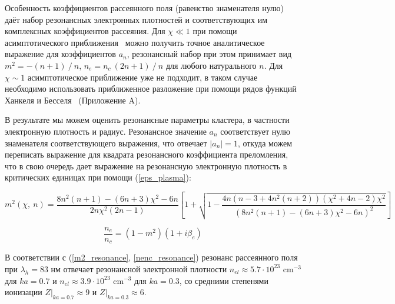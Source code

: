 
Особенность коэффициентов рассеянного поля (равенство знаменателя нулю) даёт набор резонансных электронных плотностей и соответствующих им комплексных коэффициентов рассеяния. Для $\chi \ll 1$ при помощи асимптотического приближения~\cite{andreev_lecz} можно получить точное аналитическое выражение для коэффициентов $a_n$, резонансный набор при этом принимает вид $m^2 = - (n + 1)\:/\:n$, $n_e = n_c\:(2n + 1)\:/\:n$ для любого натурального $n$. Для $\chi \sim 1$ асимптотическое приближение уже не подходит, в таком случае необходимо использовать приближенное разложение при помощи рядов функций Ханкеля и Бесселя~\cite{boren_huffman} (Приложение A).

В результате мы можем оценить резонансные параметры кластера, в частности электронную плотность и радиус. Резонансное значение $a_n$ соответствует нулю знаменателя соответствующего выражения, что отвечает $|a_n| = 1$, откуда можем переписать выражение для квадрата резонансного коэффициента преломления, что в свою очередь дает выражение на резонансную электронную плотность в критических единицах при помощи (\ref{eps_plasma}):

    \begin{equation}
        m^2 \left(\chi,\:n \right) = \frac{8n^2 (n + 1) - (6n + 3)\chi^2 - 6n}{2n \chi^2 (2n-1)} \left[ 1 + \sqrt{ 1 - \frac{4n (n-3 + 4n^2 (n + 2)) (\chi^2 + 4n-2) \chi^2}{{\left(8n^2 (n + 1) - (6n + 3)\chi^2 - 6n \right)}^{2}} } \right]
        \label{m2_resonance}
    \end{equation}

    \begin{equation}
        \frac{n_e}{n_c} = (1 - m^2) (1 + i \beta_e)
        \label{nenc_resonance}
    \end{equation}


В соответствии с (\ref{m2_resonance}, \ref{nenc_resonance}) резонанс рассеянного поля при $\lambda_{h} = 83$ нм отвечает резонансной электронной плотности $n_{el} \approx 5.7 \cdot 10^{23}$ $\textrm{cm}^{-3}$ для $ka = 0.7$ и $n_{el} \approx 3.9 \cdot 10^{23}$ $\textrm{cm}^{-3}$ для $ka = 0.3$, со средними степенями ионизации $Z|_{ka = 0.7} \approx 9$ и $Z|_{ka = 0.3} \approx 6$.